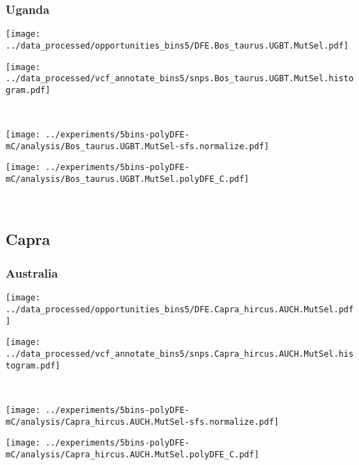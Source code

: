 \subsubsection{Uganda}

\begin{minipage}{0.49\linewidth}
    \texttt{[image: ../data\_processed/opportunities\_bins5/DFE.Bos\_taurus.UGBT.MutSel.pdf]}
\end{minipage}
\begin{minipage}{0.49\linewidth}
    \texttt{[image: ../data\_processed/vcf\_annotate\_bins5/snps.Bos\_taurus.UGBT.MutSel.histogram.pdf]}
\end{minipage}
\\
\begin{minipage}{0.49\linewidth}
    \texttt{[image: ../experiments/5bins-polyDFE-mC/analysis/Bos\_taurus.UGBT.MutSel-sfs.normalize.pdf]}
\end{minipage}
\begin{minipage}{0.49\linewidth}
    \texttt{[image: ../experiments/5bins-polyDFE-mC/analysis/Bos\_taurus.UGBT.MutSel.polyDFE\_C.pdf]}
\end{minipage}
\\

\subsection{Capra}

\subsubsection{Australia}

\begin{minipage}{0.49\linewidth}
    \texttt{[image: ../data\_processed/opportunities\_bins5/DFE.Capra\_hircus.AUCH.MutSel.pdf]}
\end{minipage}
\begin{minipage}{0.49\linewidth}
    \texttt{[image: ../data\_processed/vcf\_annotate\_bins5/snps.Capra\_hircus.AUCH.MutSel.histogram.pdf]}
\end{minipage}
\\
\begin{minipage}{0.49\linewidth}
    \texttt{[image: ../experiments/5bins-polyDFE-mC/analysis/Capra\_hircus.AUCH.MutSel-sfs.normalize.pdf]}
\end{minipage}
\begin{minipage}{0.49\linewidth}
    \texttt{[image: ../experiments/5bins-polyDFE-mC/analysis/Capra\_hircus.AUCH.MutSel.polyDFE\_C.pdf]}
\end{minipage}
\\

